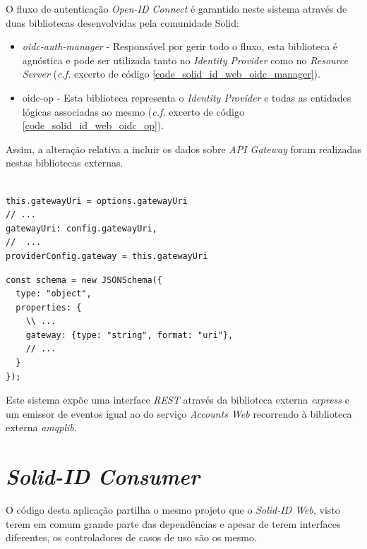 O fluxo de autenticação \emph{Open-ID Connect} é garantido neste sistema através de duas bibliotecas desenvolvidas pela comunidade Solid:
\begin{itemize}
    \item \emph{oidc-auth-manager} - Responsável por gerir todo o fluxo, esta biblioteca é agnóstica e pode ser utilizada tanto no \emph{Identity Provider} como no \emph{Resource Server} (\emph{c.f.} excerto de código \ref{code_solid_id_web_oidc_manager}).
    \item oidc-op - Esta biblioteca representa o \emph{Identity Provider} e todas as entidades lógicas associadas ao mesmo (\emph{c.f.} excerto de código \ref{code_solid_id_web_oidc_op}).
\end{itemize}

Assim, a alteração relativa a incluir os dados sobre \emph{API Gateway} foram realizadas nestas bibliotecas externas.

\begin{lstlisting}[caption={Alteração ao \emph{OIDCManager} na biblioteca nativa do \emph{Solid} \emph{oidc-auth-manager}}, label={code_solid_id_web_oidc_manager}]

this.gatewayUri = options.gatewayUri
// ...
gatewayUri: config.gatewayUri,
//  ...
providerConfig.gateway = this.gatewayUri

\end{lstlisting}

\begin{lstlisting}[caption={Alteração ao \emph{ProviderSchema} na biblioteca \emph{oidc-op}}, label={code_solid_id_web_oidc_op}]
const schema = new JSONSchema({
  type: "object",
  properties: {
    \\ ...
    gateway: {type: "string", format: "uri"},
    // ...
  }  
});

\end{lstlisting}

Este sistema expõe uma interface \emph{\acrshort{REST}} através da biblioteca externa \emph{express} e um emissor de eventos igual ao do serviço \emph{Accounts Web} recorrendo à biblioteca externa \emph{amqplib}.

\section{\emph{Solid-ID Consumer}}
O código desta aplicação partilha o mesmo projeto que o \emph{Solid-ID Web}, visto terem em comum grande parte das dependências e apesar de terem interfaces diferentes, os controladores de casos de uso são os mesmo.

